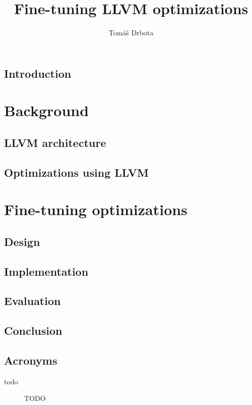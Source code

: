 \documentclass[thesis=M,english,hidelinks]{FITthesis}[2018/06/01]
\title{Fine-tuning LLVM optimizations}
\author{Tomáš Drbota} %
\begin{document}
\chapter{Introduction}



\part{Background}
\chapter{LLVM architecture}


\chapter{Optimizations using LLVM}


\part{Fine-tuning optimizations}
\chapter{Design}


\chapter{Implementation}


\chapter{Evaluation}


\chapter{Conclusion}





\appendix

\chapter{Acronyms}
\begin{description}
	\item[todo] TODO
\end{description}
\end{document}
